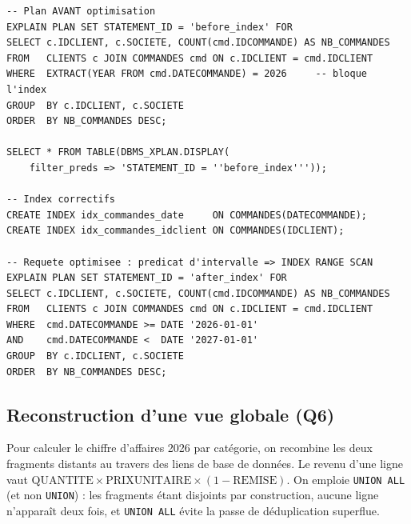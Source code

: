 \documentclass[11pt,a4paper]{article}
\begin{document}
\begin{lstlisting}[style=sql,caption={Capture d'un plan d'exécution et création d'index (extrait de \texttt{07\_query\_analysis.sql}).},label={lst:explain}]
-- Plan AVANT optimisation
EXPLAIN PLAN SET STATEMENT_ID = 'before_index' FOR
SELECT c.IDCLIENT, c.SOCIETE, COUNT(cmd.IDCOMMANDE) AS NB_COMMANDES
FROM   CLIENTS c JOIN COMMANDES cmd ON c.IDCLIENT = cmd.IDCLIENT
WHERE  EXTRACT(YEAR FROM cmd.DATECOMMANDE) = 2026     -- bloque l'index
GROUP  BY c.IDCLIENT, c.SOCIETE
ORDER  BY NB_COMMANDES DESC;

SELECT * FROM TABLE(DBMS_XPLAN.DISPLAY(
    filter_preds => 'STATEMENT_ID = ''before_index'''));

-- Index correctifs
CREATE INDEX idx_commandes_date     ON COMMANDES(DATECOMMANDE);
CREATE INDEX idx_commandes_idclient ON COMMANDES(IDCLIENT);

-- Requete optimisee : predicat d'intervalle => INDEX RANGE SCAN
EXPLAIN PLAN SET STATEMENT_ID = 'after_index' FOR
SELECT c.IDCLIENT, c.SOCIETE, COUNT(cmd.IDCOMMANDE) AS NB_COMMANDES
FROM   CLIENTS c JOIN COMMANDES cmd ON c.IDCLIENT = cmd.IDCLIENT
WHERE  cmd.DATECOMMANDE >= DATE '2026-01-01'
AND    cmd.DATECOMMANDE <  DATE '2027-01-01'
GROUP  BY c.IDCLIENT, c.SOCIETE
ORDER  BY NB_COMMANDES DESC;
\end{lstlisting}

\subsection{Reconstruction d'une vue globale (Q6)}

Pour calculer le chiffre d'affaires 2026 par catégorie, on recombine les deux
fragments distants au travers des liens de base de données. Le revenu d'une
ligne vaut $\text{QUANTITE} \times \text{PRIXUNITAIRE} \times (1 -
\text{REMISE})$. On emploie \texttt{UNION ALL} (et non \texttt{UNION}) : les
fragments étant disjoints par construction, aucune ligne n'apparaît deux fois,
et \texttt{UNION ALL} évite la passe de déduplication superflue.
\end{document}
